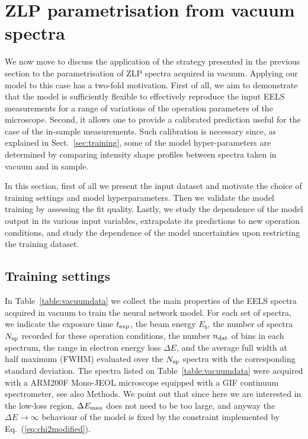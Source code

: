 \section{ZLP parametrisation from vacuum spectra}
\label{sec:results_vacuum}

We now move to discuss the application of the strategy presented in the previous
section to the parametrisation of ZLP spectra acquired in vacuum.
%
Applying our model to this case has a two-fold motivation.
%
First of all, we aim to demonstrate that the model is sufficiently flexible
to effectively reproduce the
input EELS measurements for a range of variations of the operation parameters of the microscope.
%
Second, it allows one to provide a calibrated prediction
useful for the case of the in-sample measurements.
%
Such calibration is necessary since, as explained in Sect.~\ref{sec:training}, some of the model
hyper-parameters are determined by comparing intensity shape profiles
between spectra taken in vacuum and in sample.

In this section, first of all we present the input dataset and motivate the choice
of training settings and model hyperparameters.
%
Then we validate the model training by assessing the fit quality.
%
Lastly, we study the dependence of the model output in its various input
variables, extrapolate  its predictions to new operation
conditions, and study the dependence of the model uncertainties upon
restricting the training dataset.

\subsection{Training settings}

In Table~\ref{table:vacuumdata} we collect the main properties of the EELS spectra
acquired in vacuum to train the neural
network model.  For each set of spectra, we indicate the exposure time $t_{\rm exp}$, the beam energy
$E_b$, the number of spectra $N_{\rm sp}$ recorded for these operation conditions, the number $n_{\rm dat}$ of
bins in each spectrum, the range in electron energy loss $\Delta E$,
and the average full width at half maximum (FWHM)
evaluated over the $N_{\rm sp}$ spectra with the corresponding standard deviation.
%
The spectra  listed on Table~\ref{table:vacuumdata}
were acquired with a ARM200F Mono-JEOL microscope equipped
with a GIF continuum spectrometer, see also Methods.
%
We point out that since here
we are interested in the low-loss region, $\Delta E_{\rm max}$ does not need
to be too large, and anyway the $\Delta E\to \infty$ behaviour of the model is fixed
by the constraint implemented by Eq.~(\ref{eq:chi2modified}).

